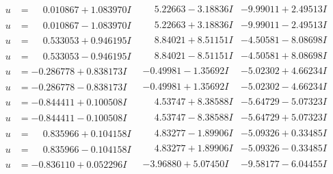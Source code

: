 \documentclass[1p]{elsarticle_modified}
\theoremstyle{definition}
\begin{document}
$$\begin{array}{c|c|c}
\begin{aligned}
u &= \phantom{-}0.010867 + 1.083970 I\end{aligned}
 & \phantom{-}5.22663 - 3.18836 I & -9.99011 + 2.49513 I \\ \hline\begin{aligned}
u &= \phantom{-}0.010867 - 1.083970 I\end{aligned}
 & \phantom{-}5.22663 + 3.18836 I & -9.99011 - 2.49513 I \\ \hline\begin{aligned}
u &= \phantom{-}0.533053 + 0.946195 I\end{aligned}
 & \phantom{-}8.84021 + 8.51151 I & -4.50581 - 8.08698 I \\ \hline\begin{aligned}
u &= \phantom{-}0.533053 - 0.946195 I\end{aligned}
 & \phantom{-}8.84021 - 8.51151 I & -4.50581 + 8.08698 I \\ \hline\begin{aligned}
u &= -0.286778 + 0.838173 I\end{aligned}
 & -0.49981 - 1.35692 I & -5.02302 + 4.66234 I \\ \hline\begin{aligned}
u &= -0.286778 - 0.838173 I\end{aligned}
 & -0.49981 + 1.35692 I & -5.02302 - 4.66234 I \\ \hline\begin{aligned}
u &= -0.844411 + 0.100508 I\end{aligned}
 & \phantom{-}4.53747 + 8.38588 I & -5.64729 - 5.07323 I \\ \hline\begin{aligned}
u &= -0.844411 - 0.100508 I\end{aligned}
 & \phantom{-}4.53747 - 8.38588 I & -5.64729 + 5.07323 I \\ \hline\begin{aligned}
u &= \phantom{-}0.835966 + 0.104158 I\end{aligned}
 & \phantom{-}4.83277 - 1.89906 I & -5.09326 + 0.33485 I \\ \hline\begin{aligned}
u &= \phantom{-}0.835966 - 0.104158 I\end{aligned}
 & \phantom{-}4.83277 + 1.89906 I & -5.09326 - 0.33485 I \\ \hline\begin{aligned}
u &= -0.836110 + 0.052296 I\end{aligned}
 & -3.96880 + 5.07450 I & -9.58177 - 6.04455 I \\ \hline\begin{aligned}

\end{aligned}
\end{array}$$
\end{document}
